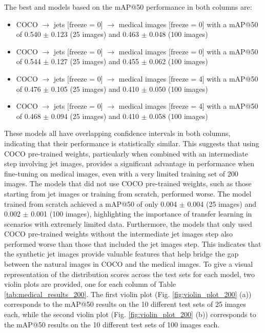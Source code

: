 The best and models based on the mAP@50 performance in both columns are:
\begin{itemize}
    \item COCO $\to$ jets {[}freeze = 0{]} $\to$ medical images {[}freeze = 0{]} with a mAP@50 of 0.540 $\pm$ 0.123 (25 images) and 0.463 $\pm$ 0.048 (100 images)
    \item COCO $\to$ jets {[}freeze = 0{]} $\to$ medical images {[}freeze = 0{]} with a mAP@50 of 0.544 $\pm$ 0.127 (25 images) and 0.455 $\pm$ 0.062 (100 images)
    \item COCO $\to$ jets {[}freeze = 0{]} $\to$ medical images {[}freeze = 4{]} with a mAP@50 of 0.476 $\pm$ 0.105 (25 images) and 0.410 $\pm$ 0.050 (100 images)
    \item COCO $\to$ jets {[}freeze = 0{]} $\to$ medical images {[}freeze = 4{]} with a mAP@50 of 0.468 $\pm$ 0.094 (25 images) and 0.410 $\pm$ 0.058 (100 images)
\end{itemize}

These models all have overlapping confidence intervals in both columns, indicating that their performance is statistically similar. This suggests that using COCO pre-trained weights, particularly when combined with an intermediate step involving jet images, provides a significant advantage in performance when fine-tuning on medical images, even with a very limited training set of 200 images.
The models that did not use COCO pre-trained weights, such as those starting from jet images or training from scratch, performed worse. The model trained from scratch achieved a mAP@50 of only 0.004 $\pm$ 0.004 (25 images) and 0.002 $\pm$ 0.001 (100 images), highlighting the importance of transfer learning in scenarios with extremely limited data.
Furthermore, the models that only used COCO pre-trained weights without the intermediate jet images step also performed worse than those that included the jet images step. This indicates that the synthetic jet images provide valuable features that help bridge the gap between the natural images in COCO and the medical images.
To give a visual representation of the distribution scores across the test sets for each model, two violin plots are provided, one for each column of Table \ref{tab:medical_results_200}. 
The first violin plot (Fig. \ref{fig:violin_plot_200} (a)) corresponds to the mAP@50 results on the 10 different test sets of 25 images each, while the second violin plot (Fig. \ref{fig:violin_plot_200} (b)) corresponds to the mAP@50 results on the 10 different test sets of 100 images each.

